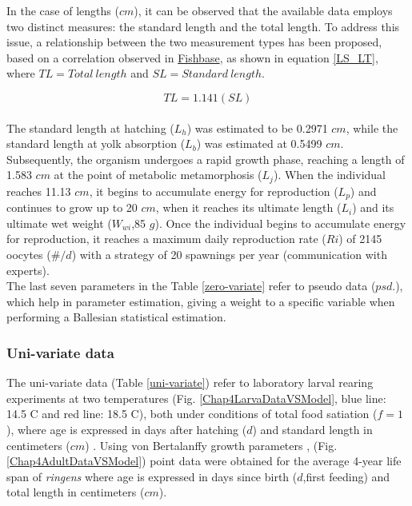 In the case of lengths ($cm$), it can be observed that the available data employs two distinct measures: the standard length and the total length. To address this issue, a relationship between the two measurement types has been proposed, based on a correlation observed in \href{https://www.fishbase.se/summary/Engraulis-ringens.html}{Fishbase}, as shown in equation \ref{LS_LT}, where $TL = Total\: length$ and $SL = Standard\: length$.

\begin{equation}
	TL = 1.141 (SL) 
	\label{LS_LT}
\end{equation}\\

The standard length at hatching ($L_{h}$) was estimated to be 0.2971 $cm$, while the standard length at yolk absorption ($L_{b}$) was estimated at 0.5499 $cm$. Subsequently, the organism undergoes a rapid growth phase, reaching a length of 1.583 $cm$ at the point of metabolic metamorphosis ($L_{j}$). When the individual reaches 11.13 $cm$, it begins to accumulate energy for reproduction ($L_{p}$) and continues to grow up to 20 $cm$, when it reaches its ultimate length ($L_{i}$) and its ultimate wet weight ($W_{wi}$,85 $g$). Once the individual begins to accumulate energy for reproduction, it reaches a maximum daily reproduction rate ($Ri$) of 2145 oocytes ($\#/d$) with a strategy of 20 spawnings per year (communication with experts).\\

The last seven parameters in the Table \ref{zero-variate} refer to pseudo data ($psd.$), which help in parameter estimation, giving a weight to a specific variable when performing a Ballesian statistical estimation.\\

\subsubsection{Uni-variate data}

The uni-variate data (Table \ref{uni-variate}) refer to laboratory larval rearing experiments at two temperatures (Fig. \ref{Chap4LarvaDataVSModel}, blue line: 14.5 \textdegree C and red line: 18.5 \textdegree C), both under conditions of total food satiation ($f=1$), where age is expressed in days after hatching ($d$) and standard length in centimeters ($cm$) \citep{RiouOfel2021}. Using von Bertalanffy growth parameters \citep{PaloMuck1987}, (Fig. \ref{Chap4AdultDataVSModel}) point data were obtained for the average 4-year life span of \textit{\gls{ringens}} where age is expressed in days since birth ($d$,first feeding) and total length in centimeters ($cm$).\\

